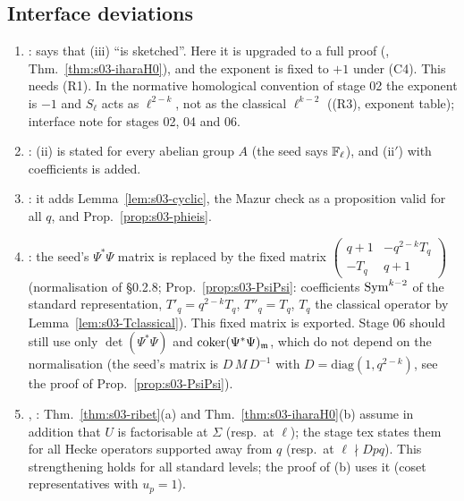 \subsection{Interface deviations}\label{ss:s03-deviations}
\begin{enumerate}[label=(D\arabic*)]
\item {}:  says that (iii) ``is sketched''. Here it is upgraded to a full proof (\stpmc, Thm.~\ref{thm:s03-iharaH0}), and the
  exponent is fixed to $+1$ under (C4). This needs (R1). In the normative homological convention of stage 02 the exponent is $-1$ and $S_\ell$ acts
  as $\ell^{2-k}$, not as the classical $\ell^{k-2}$ ((R3), exponent table); interface note for stages 02, 04 and 06.
\item {}: (ii) is stated for every abelian group $A$ (the seed says $\mathbb{F}_\ell$), and (ii$'$) with coefficients is
  added.
\item {}: it adds Lemma~\ref{lem:s03-cyclic}, the Mazur check as a proposition valid for all $q$, and
  Prop.~\ref{prop:s03-phieis}.
\item {}: the seed's $\Psi^*\Psi$ matrix is replaced by the fixed matrix
  $\left(\begin{smallmatrix}q+1&-q^{2-k}T_q\\-T_q&q+1\end{smallmatrix}\right)$ (normalisation of  \S0.2.8;
  Prop.~\ref{prop:s03-PsiPsi}: coefficients $\mathrm{Sym}^{k-2}$ of the standard representation, $T'_q=q^{2-k}T_q$, $T''_q=T_q$, $T_q$ the classical operator by
  Lemma~\ref{lem:s03-Tclassical}). This fixed matrix is exported. Stage 06 should still use only $\det(\Psi^*\Psi)$ and $\operatorname{coker}(\Psi^*\Psi)_{\mathfrak{m}}$, which
  do not depend on the normalisation (the seed's matrix is $D\,M\,D^{-1}$ with $D=\mathrm{diag}(1,q^{2-k})$, see the proof of Prop.~\ref{prop:s03-PsiPsi}).
\item {}, : Thm.~\ref{thm:s03-ribet}(a) and Thm.~\ref{thm:s03-iharaH0}(b) assume in addition that $U$ is factorisable at $\Sigma$ (resp.\ at $\ell$);
  the stage tex states them for all Hecke operators supported away from $q$ (resp.\ at $\ell\nmid Dpq$). This strengthening holds for all standard levels; the proof of (b)
  uses it (coset representatives with $u_p=1$).
\end{enumerate}
